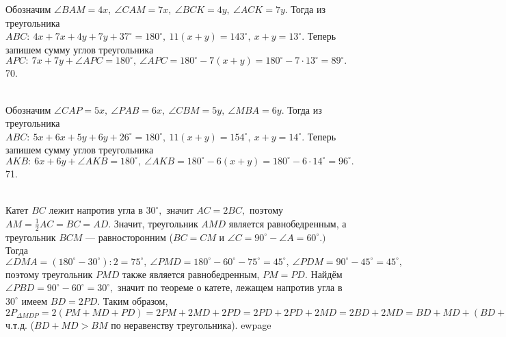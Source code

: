 Обозначим $\angle BAM=4x,\ \angle CAM=7x,\ \angle BCK=4y,\ \angle ACK=7y.$ Тогда из треугольника $ABC:\ 4x+7x+4y+7y+37^\circ=180^\circ,\ 11(x+y)=143^\circ,\ x+y=13^\circ.$ Теперь запишем сумму углов треугольника $APC:\ 7x+7y+\angle APC=180^\circ,\ \angle APC=180^\circ-7(x+y)=180^\circ-7\cdot13^\circ=89^\circ.$\\
70. \begin{figure}[ht!]
\end{figure}\\
Обозначим $\angle CAP=5x,\ \angle PAB=6x,\ \angle CBM=5y,\ \angle MBA=6y.$ Тогда из треугольника $ABC:\ 5x+6x+5y+6y+26^\circ=180^\circ,\ 11(x+y)=154^\circ,\ x+y=14^\circ.$ Теперь запишем сумму углов треугольника $AKB:\ 6x+6y+\angle AKB=180^\circ,\ \angle AKB=180^\circ-6(x+y)=180^\circ-6\cdot14^\circ=96^\circ.$\\
71. \begin{figure}[ht!]
\end{figure}\\
Катет $BC$ лежит напротив угла в $30^\circ,$ значит $AC=2BC,$ поэтому $AM=\frac{1}{2}AC=BC=AD.$ Значит, треугольник $AMD$ является равнобедренным, а треугольник $BCM$ --- равносторонним ($BC=CM$ и $\angle C=90^\circ-\angle A=60^\circ.)$ Тогда $\angle DMA=(180^\circ-30^\circ):2=75^\circ,\ \angle PMD=180^\circ-60^\circ-75^\circ=45^\circ,\ \angle PDM=90^\circ-45^\circ=45^\circ,$ поэтому треугольник $PMD$ также является равнобедренным, $PM=PD.$ Найдём $\angle PBD=90^\circ-60^\circ=30^\circ,$ значит по теореме о катете, лежащем напротив угла в $30^\circ$ имеем $BD=2PD.$ Таким образом, $2P_{\Delta MDP}=2(PM+MD+PD)=
2PM+2MD+2PD=2PD+2PD+2MD=2BD+2MD=BD+MD+(BD+MD)>BD+MD+BM=P_{\Delta MDB},$ ч.т.д. ($BD+MD>BM$ по неравенству треугольника).
ewpage

